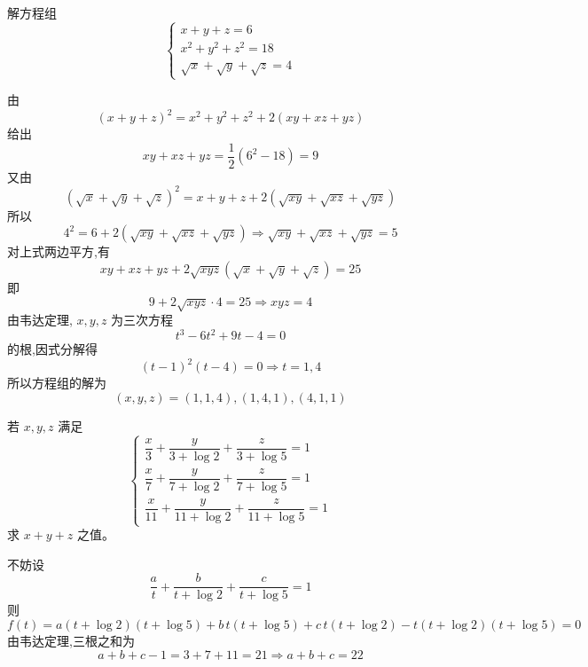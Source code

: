 \begin{questions}
    \question 解方程组
    \[
    \begin{cases}
    x+y+z=6 \\
    x^{2}+y^{2}+z^{2}=18 \\
    \sqrt{x}+\sqrt{y}+\sqrt{z}=4
    \end{cases}
    \]
    \begin{solution}
        由
        \[
        (x+y+z)^{2} = x^{2}+y^{2}+z^{2}+2(xy+xz+yz)
        \]
        给出
        \[
        xy+xz+yz = \frac{1}{2}(6^2-18) = 9
        \]
        又由 
        \[
        (\sqrt{x}+\sqrt{y}+\sqrt{z})^{2} = x+y+z+2(\sqrt{xy}+\sqrt{xz}+\sqrt{yz})
        \]
        所以 
        \[
        4^{2} = 6+2(\sqrt{xy}+\sqrt{xz}+\sqrt{yz}) \Rightarrow \sqrt{xy}+\sqrt{xz}+\sqrt{yz} = 5
        \]
        对上式两边平方,有
        \[
        xy+xz+yz+2\sqrt{xyz}(\sqrt{x}+\sqrt{y}+\sqrt{z})=25
        \]
        即
        \[
        9+2\sqrt{xyz} \cdot 4=25 \Rightarrow xyz=4
        \]
        由韦达定理, $x, y, z$ 为三次方程
        \[
        t^3 - 6t^2 + 9t - 4 = 0
        \]
        的根,因式分解得
        \[
        (t-1)^2(t-4) = 0 \Rightarrow t=1, 4
        \]
        所以方程组的解为 
        \[
        (x,y,z) = (1, 1, 4), (1, 4, 1), (4, 1, 1)
        \]
    \end{solution}

    \question 若 $x,y,z$ 满足
    \[
    \begin{cases} 
    \dfrac{x}{3} + \dfrac{y}{3+\log 2} + \dfrac{z}{3+\log 5} = 1 \\[8pt]
    \dfrac{x}{7} + \dfrac{y}{7+\log 2} + \dfrac{z}{7+\log 5} = 1 \\[8pt]
    \dfrac{x}{11} + \dfrac{y}{11+\log 2} + \dfrac{z}{11+\log 5} = 1
    \end{cases}
    \]
    求 $x+y+z$ 之值。
    \begin{solution}
        不妨设
        \[
        \frac{a}{t}+\frac{b}{t+\log 2}+\frac{c}{t+\log 5}=1
        \]
        则
        \[
        f(t)=a(t+\log 2)(t+\log 5)+b\,t(t+\log 5)+c\,t(t+\log 2)-t(t+\log 2)(t+\log 5)=0
        \]
        由韦达定理,三根之和为
        \[
        a+b+c-1=3+7+11=21 \Rightarrow a+b+c=22
        \]
    \end{solution}


\end{questions}
